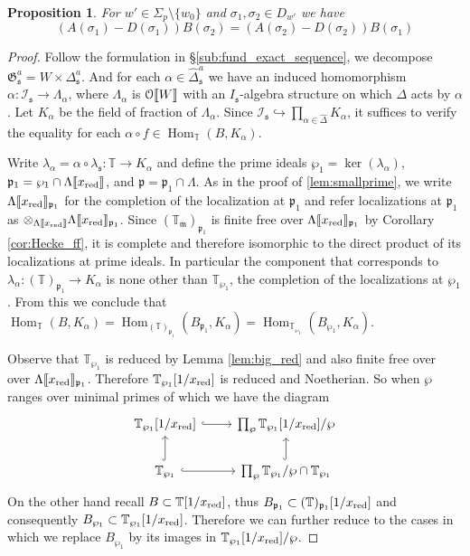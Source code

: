 \documentclass[leqno]{amsart}
\newtheorem{prop}[thm]{Proposition}
\theoremstyle{definition}
\theoremstyle{remark}
\newcommand{\eo}{\EuScript{O}}
\DeclareMathOperator{\Hom}{Hom}
\newcommand{\fm}{\mathfrak{m}}
\newcommand{\fp}{\mathfrak{p}}
\newcommand{\fs}{\mathfrak{s}}
\newcommand{\xx}{x_\textnormal{red}}
\newcommand{\fG}{\mathfrak{G}}
\newcommand{\TT}{\mathbb{T}} %
\newcommand{\I}{\mathcal{I}} %
\begin{document}
\begin{prop}\label{prop:res}
For $w'\in\Sigma_p\setminus\{w_0\}$
and $\sigma_1,\sigma_2\in D_{w'}$ we have
\[
(A(\sigma_1)-D(\sigma_1))B(\sigma_2)=
(A(\sigma_2)-D(\sigma_2))B(\sigma_1)
\]
\end{prop}
\begin{proof}

Follow the formulation in \S\ref{sub:fund_exact_sequence},
we decompose $\fG_\fs^a=W\times\Delta_\fs^a$.
And for each $\alpha\in\widehat{\Delta}_\fs^a$ 
we have an induced homomorphism
$\alpha\colon \I_\fs\to \Lambda_\alpha$,
where $\Lambda_\alpha$ is $\eo\llbracket W\rrbracket$
with an $I_\fs$-algebra structure on which $\Delta$ acts by $\alpha$.
Let $K_\alpha$ be the field of fraction of $\Lambda_\alpha$.
Since $\I_\fs\hookrightarrow 
\prod_{\alpha\in\hat{\Delta}}K_\alpha$,
it suffices to verify the equality for each 
$\alpha\circ f\in \Hom_{\TT}(B,K_\alpha)$.



Write $\lambda_\alpha=\alpha\circ\lambda_\fs
\colon\TT\to K_\alpha$
and define the prime ideals $\wp_1=\ker(\lambda_\alpha)$,
$\fp_1=\wp_1\cap\Lambda\llbracket\xx\rrbracket$,
and $\fp=\fp_1\cap \Lambda$.
As in the proof of \ref{lem:smallprime},
we write $\Lambda\llbracket\xx\rrbracket_{\fp_1}$
for the completion of the localization at $\fp_1$
and refer localizations at $\fp_1$ as
$\otimes_{\Lambda\llbracket\xx\rrbracket}
\Lambda\llbracket\xx\rrbracket_{\fp_1}$.
Since $(\TT_{\fm})_{\fp_1}$ is finite free
over $\Lambda\llbracket\xx\rrbracket_{\fp_1}$
by Corollary \ref{cor:Hecke_ff},
it is complete and therefore isomorphic
to the direct product of its localizations 
at prime ideals.
In particular the component that corresponds to 
$\lambda_\alpha\colon (\TT)_{\fp_1}\to K_\alpha$
is none other than $\TT_{\wp_1}$,
the completion of the localizations at $\wp_1$.
From this we conclude that
$\Hom_{\TT}(B,K_\alpha)=
\Hom_{(\TT)_{\fp_1}}(B_{\fp_1},K_\alpha)=
\Hom_{\TT_{\wp_1}}(B_{\wp_1},K_\alpha)$.


Observe that $\TT_{\wp_1}$ is reduced by Lemma \ref{lem:big_red}
and also finite free over over 
$\Lambda\llbracket\xx\rrbracket_{\fp_1}$.
Therefore $\TT_{\wp_1}[1/\xx]$ is reduced and Noetherian.
So when $\wp$ ranges over minimal primes of which we have the diagram
\[
\begin{tikzcd}
\TT_{\wp_1}[1/\xx] \arrow[r,hookrightarrow] &
\prod_{\wp} \TT_{\wp_1}[1/\xx]/\wp \\
\TT_{\wp_1} \arrow[u,hookrightarrow] \arrow[r,hookrightarrow] &
\prod_{\wp} \TT_{\wp_1}/\wp\cap \TT_{\wp_1}\arrow[u,hookrightarrow] 
\end{tikzcd}
\]
On the other hand recall $B\subset \TT[1/\xx]$,
thus $B_{\fp_1}\subset (\TT)_{\fp_1}[1/\xx]$ and 
consequently $B_{\wp_1}\subset \TT_{\wp_1}[1/\xx]$.
Therefore we can further reduce to the cases
in which we replace $B_{\wp_1}$
by its images in $\TT_{\wp_1}[1/\xx]/\wp$.


\end{proof}
\end{document}
